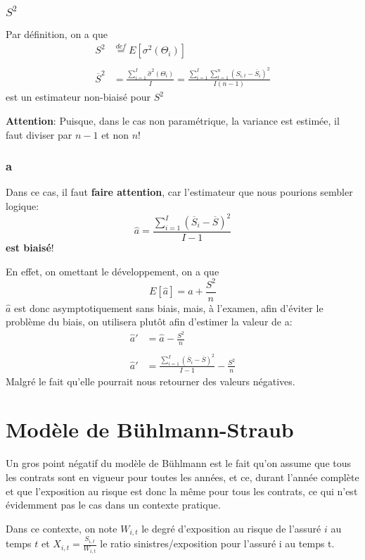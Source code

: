 \documentclass[11pt,french]{report}
\begin{document}
\subsubsection{\textit{$S^2$}} 
Par définition, on a que 
$$\boxed{\begin{aligned}
S^2 &\overset{def}{=} E[\sigma^2(\Theta_i)] \\ \\
\overline{S}^2 &= \frac{\sum_{i=1}^I \widehat{\sigma}^2(\Theta_i)}{I} = \frac{\sum_{i=1}^I \sum_{t=1}^n (S_{i,t}-\overline{S}_i)^2}{I(n-1)}
\end{aligned}}$$
est un estimateur non-biaisé pour $S^2$

\textbf{Attention}: Puisque, dans le cas non paramétrique, la variance est estimée, il faut diviser par $n-1$ et non $n$!

\subsubsection{a}
Dans ce cas, il faut \textbf{faire attention}, car l'estimateur que nous pourions sembler logique:
$$\boxed{\widehat{a} = \frac{\sum_{i=1}^I (\overline{S}_i - \overline{S})^2}{I-1}}$$
\textbf{est biaisé}!

En effet, on omettant le développement, on a que 
$$E[\widehat{a}] = a + \frac{S^2}{n}$$
$\widehat{a}$ est donc asymptotiquement sans biais, mais, à l'examen, afin d'éviter le problème du biais, on utilisera plutôt afin d'estimer la valeur de a:
$$\boxed{\begin{aligned}
\widehat{a}' &= \widehat{a} - \frac{S^2}{n} \\ \\
\widehat{a}' &= \frac{\sum_{i=1}^I (\overline{S}_i - \overline{S})^2}{I-1} - \frac{S^2}{n}
\end{aligned}}$$
Malgré le fait qu'elle pourrait nous retourner des valeurs négatives.

\section{Modèle de Bühlmann-Straub } 

Un gros point négatif du modèle de Bühlmann est le fait qu'on assume que tous les contrats sont en vigueur pour toutes les années, et ce, durant l'année complète et que l'exposition au risque est donc la même pour tous les contrats, ce qui n'est évidemment pas le cas dans un contexte pratique.

Dans ce contexte, on note $W_{i,t}$ le degré d'exposition au risque de l'assuré $i$ au temps $t$ et $X_{i,t}= \frac{S_{i,t}}{W_{i,t}}$ le ratio sinistres/exposition pour l'assuré i au temps t.
\end{document}
